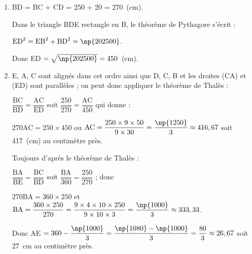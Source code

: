 \begin{enumerate}
\item %
BD = BC + CD = 250 + 20 = 270~(cm).

Dans le triangle BDE rectangle en B, le théorème de Pythagore s’écrit :

$\text{ED}^2 = \text{EB}^2 + \text{BD}^2  = \np{202500}$.

Donc ED $ = \sqrt{\np{202500}} = 450$~(cm).
\item %
E, A, C sont alignés dans cet ordre ainsi que D, C, B et les droites (CA) et (ED) sont parallèles ; on peut donc appliquer le théorème de Thalès :

$\dfrac{\text{BC}}{\text{BD}} = \dfrac{\text{AC}}{\text{ED}}$ soit $\dfrac {250}{270} = \dfrac{\text{AC}}{450}$ qui donne :

$270 \text{AC} = 250 \times 450$ ou  $\text{AC} = \dfrac{250 \times 9 \times 50}{9 \times 30} = \dfrac{\np{1250}}{3} \approx 416,67$ soit 417~(cm) au centimètre près.

Toujours d’après le théorème de Thalès :

$\dfrac{\text{BA}}{\text{BE}} = \dfrac{\text{BC}}{\text{BD}}$ soit $\dfrac{\text{BA}}{\text{360}} = \dfrac{250}{270}$ ; donc 

$270\text{BA} = 360 \times 250$ et $\text{BA} = \dfrac{360 \times 250}{270} = \dfrac{9 \times 4 \times 10 \times 250}{9 \times 10 \times 3} = \dfrac{\np{1000}}{3} \approx 333,33$.

Donc AE $= 360 - \dfrac{\np{1000}}{3} = \dfrac{\np{1080} - \np{1000}}{3} = \dfrac{80}{3} \approx 26,67$ soit 27~cm au centimètre près.
\end{enumerate}

\vspace{0,5cm}

